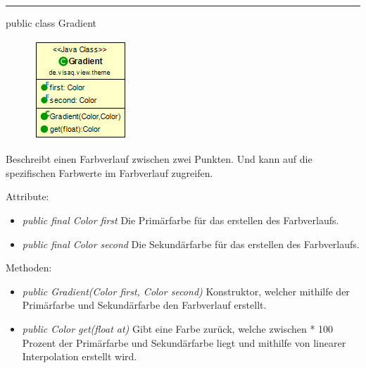 \rule{\textwidth}{0.4pt} 
public class Gradient

\begin{minipage}{0.3\textwidth}
    \begin{figure}[H]
    \includegraphics[scale = 0.5]{media/frontend/view/de.view.elements.theme/Gradient_Class.png}
    \end{figure}
    \end{minipage} \hfill
    \begin{minipage}{0.6\textwidth}
    Beschreibt einen Farbverlauf zwischen zwei Punkten. Und kann auf die spezifischen Farbwerte im Farbverlauf zugreifen.
    \end{minipage}

    Attribute:
\begin{itemize} 
    \item \emph{public final Color first} Die Primärfarbe für das erstellen des Farbverlaufs.
    \item \emph{public final Color second} Die Sekundärfarbe für das erstellen des Farbverlaufs.
\end{itemize}
Methoden:
\begin{itemize} 
    \item \emph{public Gradient(Color first, Color second)} Konstruktor, welcher mithilfe der Primärfarbe und Sekundärfarbe den Farbverlauf erstellt.
    \item \emph{public Color get(float at)} Gibt eine Farbe zurück, welche zwischen * 100 Prozent der Primärfarbe und Sekundärfarbe liegt und mithilfe von linearer Interpolation erstellt wird.
\end{itemize}
